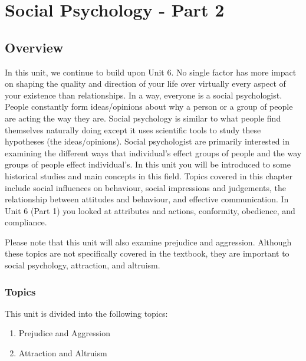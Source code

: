 \documentclass[
]{book}
\providecommand{\tightlist}{%
  \setlength{\itemsep}{0pt}\setlength{\parskip}{0pt}}
\begin{document}
\hypertarget{social-psychology---part-2}{%
\chapter{Social Psychology - Part 2}\label{social-psychology---part-2}}

\hypertarget{overview-6}{%
\section*{Overview}\label{overview-6}}

In this unit, we continue to build upon Unit 6. No single factor has more impact on shaping the quality and direction of your life over virtually every aspect of your existence than relationships. In a way, everyone is a social psychologist. People constantly form ideas/opinions about why a person or a group of people are acting the way they are. Social psychology is similar to what people find themselves naturally doing except it uses scientific tools to study these hypotheses (the ideas/opinions). Social psychologist are primarily interested in examining the different ways that individual's effect groups of people and the way groups of people effect individual's. In this unit you will be introduced to some historical studies and main concepts in this field. Topics covered in this chapter include social influences on behaviour, social impressions and judgements, the relationship between attitudes and behaviour, and effective communication. In Unit 6 (Part 1) you looked at attributes and actions, conformity, obedience, and compliance.

Please note that this unit will also examine prejudice and aggression. Although these topics are not specifically covered in the textbook, they are important to social psychology, attraction, and altruism.

\hypertarget{topics-6}{%
\subsection*{Topics}\label{topics-6}}

This unit is divided into the following topics:

\begin{enumerate}
\def\labelenumi{\arabic{enumi}.}
\tightlist
\item
  Prejudice and Aggression\\
\item
  Attraction and Altruism
\end{enumerate}
\end{document}
